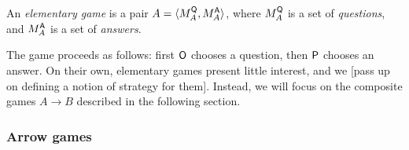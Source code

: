 \begin{definition} %
An \emph{elementary game} is a pair
$A = \langle M_A^{ \mathsf{Q} }, M_A^{ \mathsf{A} } \rangle$, where
$M_A^{ \mathsf{Q} }$ is a set of \emph{questions}, and
$M_A^{ \mathsf{A} }$ is a set of \emph{answers}.
\end{definition}

The game proceeds as follows:
first $ \mathsf{O} $ chooses a question,
then $ \mathsf{P} $ chooses an answer.
On their own,
elementary games present little interest,
and we [pass up on defining a notion of strategy for them].
Instead, we will focus on
the composite games $A \rightarrow B$
described in the following section.

%
%
%
%
%


\subsubsection{Arrow games} %
\label{sec:arrow}

